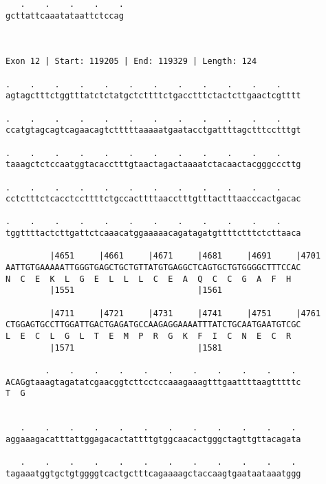 \documentclass{article}
\begin{document}
\begin{Verbatim}
   .    .    .    .    .
gcttattcaaatataattctccag
                        
                        
 
Exon 12 | Start: 119205 | End: 119329 | Length: 124
 
.    .    .    .    .    .    .    .    .    .    .    .    
agtagctttctggtttatctctatgctcttttctgacctttctactcttgaactcgtttt
                                                            
.    .    .    .    .    .    .    .    .    .    .    .    
ccatgtagcagtcagaacagtctttttaaaaatgaatacctgattttagctttcctttgt
                                                            
.    .    .    .    .    .    .    .    .    .    .    .    
taaagctctccaatggtacacctttgtaactagactaaaatctacaactacgggcccttg
                                                            
.    .    .    .    .    .    .    .    .    .    .    .    
cctctttctcacctccttttctgccacttttaacctttgtttactttaacccactgacac
                                                            
.    .    .    .    .    .    .    .    .    .    .    .    
tggttttactcttgattctcaaacatggaaaaacagatagatgttttctttctcttaaca
                                                            
         |4651     |4661     |4671     |4681     |4691     |4701
AATTGTGAAAAATTGGGTGAGCTGCTGTTATGTGAGGCTCAGTGCTGTGGGGCTTTCCAC
N  C  E  K  L  G  E  L  L  L  C  E  A  Q  C  C  G  A  F  H  
         |1551                         |1561                
  
         |4711     |4721     |4731     |4741     |4751     |4761
CTGGAGTGCCTTGGATTGACTGAGATGCCAAGAGGAAAATTTATCTGCAATGAATGTCGC
L  E  C  L  G  L  T  E  M  P  R  G  K  F  I  C  N  E  C  R  
         |1571                         |1581                
  
        .    .    .    .    .    .    .    .    .    .    . 
ACAGgtaaagtagatatcgaacggtcttcctccaaagaaagtttgaattttaagtttttc
T  G                                                        
                                                            
  
   .    .    .    .    .    .    .    .    .    .    .    . 
aggaaagacatttattggagacactattttgtggcaacactgggctagttgttacagata
                                                            
   .    .    .    .    .    .    .    .    .    .    .    . 
tagaaatggtgctgtggggtcactgctttcagaaaagctaccaagtgaataataaatggg
                                                            

\end{Verbatim}
\end{document}
